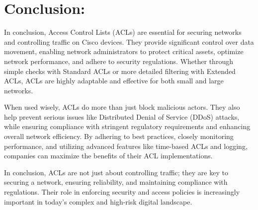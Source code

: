\documentclass[11pt,a4paper]{article}
\begin{document}
\section*{Conclusion:}
In conclusion, Access Control Lists (ACLs) are essential for securing networks and controlling traffic on Cisco devices. They provide significant control over data movement, enabling network administrators to protect critical assets, optimize network performance, and adhere to security regulations. Whether through simple checks with Standard ACLs or more detailed filtering with Extended ACLs, ACLs are highly adaptable and effective for both small and large networks.

When used wisely, ACLs do more than just block malicious actors. They also help prevent serious issues like Distributed Denial of Service (DDoS) attacks, while ensuring compliance with stringent regulatory requirements and enhancing overall network efficiency. By adhering to best practices, closely monitoring performance, and utilizing advanced features like time-based ACLs and logging, companies can maximize the benefits of their ACL implementations.

In conclusion, ACLs are not just about controlling traffic; they are key to securing a network, ensuring reliability, and maintaining compliance with regulations. Their role in enforcing security and access policies is increasingly important in today’s complex and high-risk digital landscape.

\newpage


\begin{multicols}{2}
    \small
    
    \makeatletter
  \renewcommand\@biblabel[1]{#1.} 
    
   
\end{multicols}
  
\end{document}
